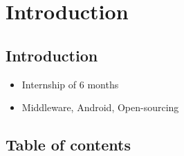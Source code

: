 %
%

\section{Introduction}

\subsection{Introduction}
\begin{FrameWithSubSection}
    \begin{itemize}
        \item Internship of 6 months
        \item Middleware, Android, Open-sourcing
    \end{itemize}
\end{FrameWithSubSection}

\subsection{Table of contents}
